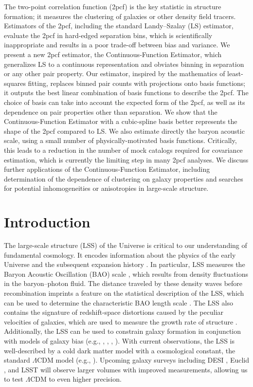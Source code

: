 The two-point correlation function (2pcf) is the key statistic in structure formation; it measures the clustering of galaxies or other density field tracers. Estimators of the 2pcf, including the standard Landy--Szalay (LS) estimator, evaluate the 2pcf in hard-edged separation bins, which is scientifically inappropriate and results in a poor trade-off between bias and variance. We present a new 2pcf estimator, the Continuous-Function Estimator, which generalizes LS to a continuous representation and obviates binning in separation or any other pair property. Our estimator, inspired by the mathematics of least-squares fitting, replaces binned pair counts with projections onto basis functions; it outputs the best linear combination of basis functions to describe the 2pcf. The choice of basis can take into account the expected form of the 2pcf, as well as its dependence on pair properties other than separation. We show that the Continuous-Function Estimator with a cubic-spline basis better represents the shape of the 2pcf compared to LS. We also estimate directly the baryon acoustic scale, using a small number of physically-motivated basis functions. Critically, this leads to a reduction in the number of mock catalogs required for covariance estimation, which is currently the limiting step in many 2pcf analyses. We discuss further applications of the Continuous-Function Estimator, including determination of the dependence of clustering on galaxy properties and searches for potential inhomogeneities or anisotropies in large-scale structure.


\section{Introduction}

The large-scale structure (LSS) of the Universe is critical to our understanding of fundamental cosmology. 
It encodes information about the physics of the early Universe and the subsequent expansion history \citep{SunyaevZeldovich1970, HuSugiyama1996, Riess1998}.
In particular, LSS measures the Baryon Acoustic Oscillation (BAO) scale \citep{Cole2005, Eisenstein2005}, which results from density fluctuations in the baryon--photon fluid.
The distance traveled by these density waves before recombination imprints a feature on the statistical description of the LSS, which can be used to determine the characteristic BAO length scale \citep{PeeblesYu1970, EisensteinHu1998}.
The LSS also contains the signature of redshift-space distortions caused by the peculiar velocities of galaxies, which are used to measure the growth rate of structure \citep{Kaiser1987}.
Additionally, the LSS can be used to constrain galaxy formation in conjunction with models of galaxy bias (e.g., \citealt{Hamilton1988},  \citealt{Li2006}, \citealt{Zehavi2011}, \citealt{Durkalec2018}).
With current observations, the LSS is well-described by a cold dark matter model with a cosmological constant, the standard $\Lambda$CDM model (e.g., \citealt{Alam2017}).
Upcoming galaxy surveys including DESI \citep{Aghamousa2016}, Euclid \citep{Laureijs2011}, and LSST \citep{Ivezic2018} will observe larger volumes with improved measurements, allowing us to test $\Lambda$CDM to even higher precision.

